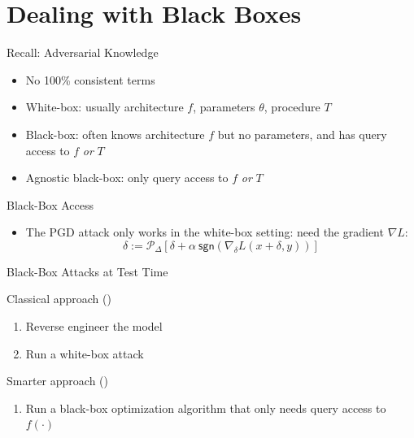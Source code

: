 \documentclass[10pt]{beamer}
\begin{document}
\section{Dealing with Black Boxes}


\begin{frame}{Recall: Adversarial Knowledge}

  \begin{itemize}[<+-| @alert+>]
    \item No 100\% consistent terms
    \item White-box: usually architecture $f$, parameters $\theta$, procedure $T$
    \item Black-box: often knows architecture $f$ but no parameters, and has query access to $f$
        \emph{or} $T$
    \item Agnostic black-box: only query access to $f$ \emph{or} $T$
  \end{itemize}

\end{frame}


\begin{frame}{Black-Box Access}

  \begin{itemize}[<+-| @alert+>]
    \item The PGD attack only works in the white-box setting: need the gradient $\nabla L$:
    \[
      \delta := \mathcal{P}_\Delta
        \left[ \delta + \alpha \ \textsf{sgn}(\nabla_\delta L(x + \delta, y))\right]
    \]
  \end{itemize}



\end{frame}


\begin{frame}{Black-Box Attacks at Test Time}

  Classical approach (\cite{LowdM05})

  \pause
  \begin{enumerate}[<+-| @alert+>]
    \item Reverse engineer the model
    \item Run a white-box attack
  \end{enumerate}

  Smarter approach (\cite{ChenZSYH17})

  \begin{enumerate}[<+-| @alert+>]
    \item Run a black-box optimization algorithm that only needs query access to $f(\cdot)$
  \end{enumerate}

\end{frame}
\end{document}
